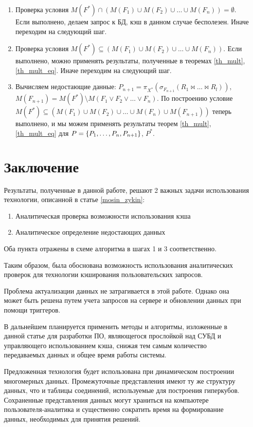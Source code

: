 \documentclass[10pt,a4paper]{article}
\begin{document}
\begin{enumerate}[label=\bfseries Шаг \arabic*:]
  \item Проверка условия $M(F^{\ast}) \cap (M(F_1) \cup M(F_2) \cup \dots \cup M(F_n)) = \emptyset$.
  Если выполнено, делаем запрос к БД, кэш в данном случае бесполезен. Иначе переходим на
  следующий шаг.
  \item Проверка условия $M(F^{\ast}) \subseteq (M(F_1) \cup M(F_2) \cup \dots \cup M(F_n))$. Если
  выполнено, можно применять результаты, полученные в теоремах \ref{th_mult}, \ref{th_mult_eq}. Иначе переходим на следующий шаг.
  \item Вычисляем недостающие данные: $P_{n + 1} = \pi_{X^{\ast}} (\sigma_{F_{n + 1}} (R_1 \Join
  \dots \Join R_l))$, $M(F_{n + 1}) = M(F^{\ast}) \setminus M(F_1 \vee F_2 \vee \dots \vee F_n)$. По построению условие $M(F^{\ast})
  \subseteq (M(F_1) \cup M(F_2) \cup \dots \cup M(F_n) \cup M(F_{n + 1}))$ теперь выполнено, и мы
  можем применять результаты теорем \ref{th_mult}, \ref{th_mult_eq} для $P = \{P_1, \dots, P_n,\\ P_{n + 1}\}$, $P^{\ast}$.
\end{enumerate}

\section*{Заключение}
Результаты, полученные в данной работе, решают 2 важных задачи использования технологии, описанной в статье \ref{mosin_zykin}:
\begin{enumerate}
  \item Аналитическая проверка возможности использования кэша    
  \item Аналитическое определение недостающих данных
\end{enumerate}

Оба пункта отражены в схеме алгоритма в шагах 1 и 3 соответственно.

Таким образом, была обоснована возможность использования аналитических проверок для технологии кэширования пользовательских запросов.

Проблема актуализации данных не затрагивается в этой работе. Однако она может быть решена
путем учета запросов на сервере и обновлении данных при помощи триггеров.

В дальнейшем планируется применить методы и алгоритмы, изложенные в данной статье для разработки ПО, являющегося прослойкой над СУБД и управляющего использованием кэша, снижая тем самым количество передаваемых данных и общее время работы системы.

Предложенная технология будет использована при динамическом построении многомерных данных.
Промежуточные представления имеют ту же структуру данных, что и таблицы соединений, используемые для
построения гиперкубов. Сохраненные представления данных могут храниться на компьютере пользователя-аналитика и существенно сократить время на формирование данных, необходимых для принятия решений.
\end{document}
